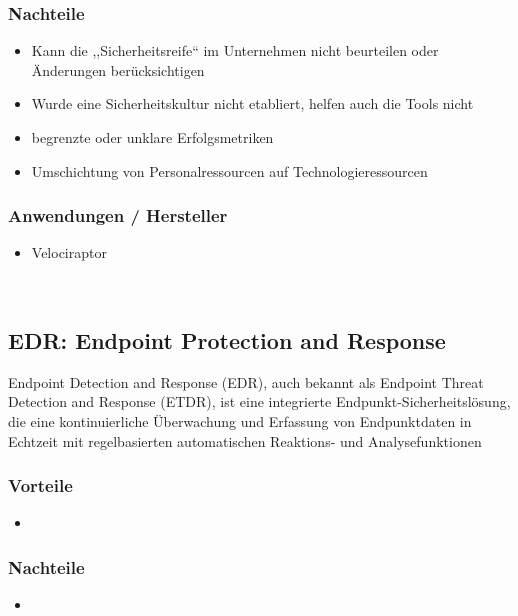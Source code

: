 \subsubsection{Nachteile}
\begin{itemize}
    \item Kann die ,,Sicherheitsreife`` im Unternehmen nicht beurteilen oder Änderungen berücksichtigen
    \item Wurde eine Sicherheitskultur nicht etabliert, helfen auch die Tools nicht
    \item begrenzte oder unklare Erfolgsmetriken
    \item Umschichtung von Personalressourcen auf Technologieressourcen
\end{itemize}

\subsubsection{Anwendungen / Hersteller}
\begin{itemize}
    \item Velociraptor
\end{itemize}


\vfill
$ $
\columnbreak


\subsection{EDR: Endpoint Protection and Response}\label{subsec:edr}
Endpoint Detection and Response (EDR), auch bekannt als Endpoint Threat Detection and Response (ETDR), ist eine integrierte Endpunkt-Sicherheitslösung, die eine kontinuierliche Überwachung und Erfassung von Endpunktdaten in Echtzeit mit regelbasierten automatischen Reaktions- und Analysefunktionen

\subsubsection{Vorteile}
\begin{itemize}
    \item %
\end{itemize}

\subsubsection{Nachteile}
\begin{itemize}
    \item %
\end{itemize}

